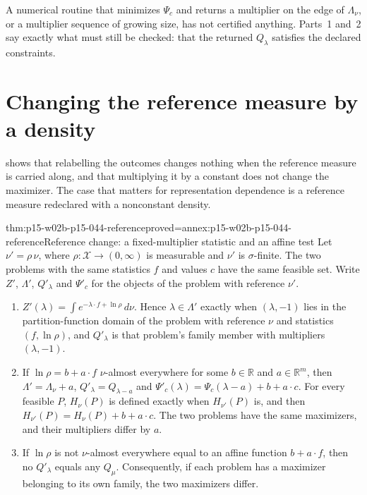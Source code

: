 A numerical routine that minimizes \(\Psi_c\) and returns a multiplier on
the edge of \(\Lambda_\nu\), or a multiplier sequence of growing size,
has not certified anything. Parts~1 and~2 say exactly what must still be
checked: that the returned \(Q_\lambda\) satisfies the declared
constraints.

\section{Changing the reference measure by a density}
\label{sec:p15-w02b-p15-044-reference}

 shows that relabelling the
outcomes changes nothing when the reference measure is carried along, and
that multiplying it by a constant does not change the maximizer. The case
that matters for representation dependence is a reference measure
redeclared with a nonconstant density.

\begin{hbtheorem}{thm:p15-w02b-p15-044-reference}{proved=annex:p15-w02b-p15-044-reference}{Reference change: a fixed-multiplier statistic and an affine test}
Let \(\nu'=\rho\,\nu\), where \(\rho:\mathcal X\to(0,\infty)\) is
measurable and \(\nu'\) is \(\sigma\)-finite. The two problems with the
same statistics \(f\) and values \(c\) have the same feasible set.
Write \(Z'\), \(\Lambda'\), \(Q'_\lambda\) and \(\Psi'_c\) for the objects
of the problem with reference \(\nu'\).
\begin{enumerate}
\item \(Z'(\lambda)=\int e^{-\lambda\cdot f+\ln\rho}\,d\nu\). Hence
\(\lambda\in\Lambda'\) exactly when \((\lambda,-1)\) lies in the
partition-function domain of the problem with reference \(\nu\) and
statistics \((f,\ln\rho)\), and \(Q'_\lambda\) is that problem's family
member with multipliers \((\lambda,-1)\).
\item If \(\ln\rho=b+a\cdot f\) \(\nu\)-almost everywhere for some
\(b\in\mathbb R\) and \(a\in\mathbb R^m\), then
\(\Lambda'=\Lambda_\nu+a\), \(Q'_\lambda=Q_{\lambda-a}\) and
\(\Psi'_c(\lambda)=\Psi_c(\lambda-a)+b+a\cdot c\). For every feasible
\(P\), \(H_\nu(P)\) is defined exactly when \(H_{\nu'}(P)\) is, and then
\(H_{\nu'}(P)=H_\nu(P)+b+a\cdot c\). The two problems have the same
maximizers, and their multipliers differ by \(a\).
\item If \(\ln\rho\) is not \(\nu\)-almost everywhere equal to an affine
function \(b+a\cdot f\), then no \(Q'_\lambda\) equals any \(Q_\mu\).
Consequently, if each problem has a maximizer belonging to its own family,
the two maximizers differ.
\end{enumerate}
\end{hbtheorem}

